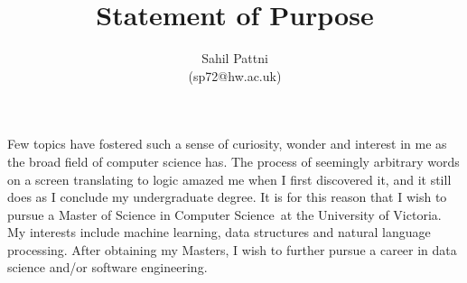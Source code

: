 \documentclass[a4paper,11pt]{article}
\newcommand{\uni}{the University of Victoria}
\newcommand{\program}{Master of Science in Computer Science}
\newcommand{\supervisor}{\textbf{Professor Neamat El Gayar}}
\begin{document}
\title{Statement of Purpose}

\author{Sahil Pattni\\(sp72@hw.ac.uk)}
\date{}
\maketitle

Few topics have fostered such a sense of curiosity, wonder and interest in me as the broad field of computer science has. The process of seemingly arbitrary words on a screen translating to logic amazed me when I first discovered it, and it still does as I conclude my undergraduate degree. It is for this reason that I wish to pursue a \program\ at \uni. My interests include machine learning, data structures and natural language processing. After obtaining my Masters, I wish to further pursue a career in data science and/or software engineering.


\end{document}
